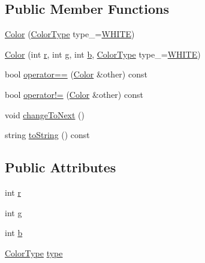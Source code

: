 \subsection*{Public Member Functions}
\begin{DoxyCompactItemize}
\item 
\hyperlink{struct_color_a1c725b23115abbe495b9ad6986ace728}{Color} (\hyperlink{struct_color_a9216c50419c87f87e2de51ce5bd73be9}{Color\+Type} type\+\_\+=\hyperlink{struct_color_a9216c50419c87f87e2de51ce5bd73be9a523c4a74d174943a6216bd194664049c}{W\+H\+I\+TE})
\item 
\hyperlink{struct_color_a0107db39c9bdbdc7c8ff844db0286329}{Color} (int \hyperlink{struct_color_a4954bdc9772da2a610401b8a438125cb}{r}, int \hyperlink{struct_color_ab5656e995bddd43d286c7ff5629a31dd}{g}, int \hyperlink{struct_color_ae11f00d34bf3ecd8c8278f68876b82bf}{b}, \hyperlink{struct_color_a9216c50419c87f87e2de51ce5bd73be9}{Color\+Type} type\+\_\+=\hyperlink{struct_color_a9216c50419c87f87e2de51ce5bd73be9a523c4a74d174943a6216bd194664049c}{W\+H\+I\+TE})
\item 
bool \hyperlink{struct_color_ab950c33dd4a93662106299a310208fd5}{operator==} (\hyperlink{struct_color}{Color} \&other) const
\item 
bool \hyperlink{struct_color_a5e6b0ee87e2110887bdcd2cba81bf2bb}{operator!=} (\hyperlink{struct_color}{Color} \&other) const
\item 
void \hyperlink{struct_color_a18edabbf8e25cbe1d3eb90e6561e6e62}{change\+To\+Next} ()
\item 
string \hyperlink{struct_color_adcd722253e9d2bc4b7efd30d4f1c3eca}{to\+String} () const
\end{DoxyCompactItemize}
\subsection*{Public Attributes}
\begin{DoxyCompactItemize}
\item 
int \hyperlink{struct_color_a4954bdc9772da2a610401b8a438125cb}{r}
\item 
int \hyperlink{struct_color_ab5656e995bddd43d286c7ff5629a31dd}{g}
\item 
int \hyperlink{struct_color_ae11f00d34bf3ecd8c8278f68876b82bf}{b}
\item 
\hyperlink{struct_color_a9216c50419c87f87e2de51ce5bd73be9}{Color\+Type} \hyperlink{struct_color_a3e03553ecdc4f69087d3d0e9103d0b87}{type}
\end{DoxyCompactItemize}


